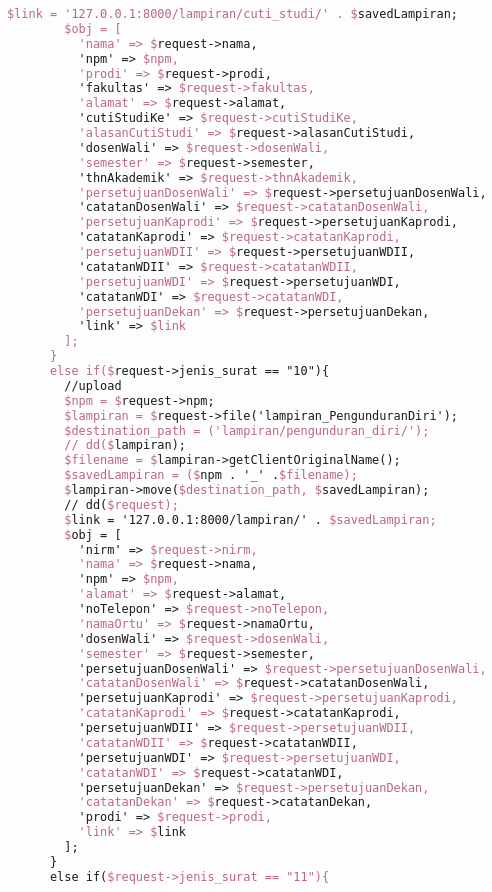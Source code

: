 \begin{lstlisting}[language=tex,basicstyle=\tiny,caption=PesanansuratController.php]
        $link = '127.0.0.1:8000/lampiran/cuti_studi/' . $savedLampiran;
        $obj = [
          'nama' => $request->nama,
          'npm' => $npm,
          'prodi' => $request->prodi,
          'fakultas' => $request->fakultas,
          'alamat' => $request->alamat,
          'cutiStudiKe' => $request->cutiStudiKe,
          'alasanCutiStudi' => $request->alasanCutiStudi,
          'dosenWali' => $request->dosenWali,
          'semester' => $request->semester,
          'thnAkademik' => $request->thnAkademik,
          'persetujuanDosenWali' => $request->persetujuanDosenWali,
          'catatanDosenWali' => $request->catatanDosenWali,
          'persetujuanKaprodi' => $request->persetujuanKaprodi,
          'catatanKaprodi' => $request->catatanKaprodi,
          'persetujuanWDII' => $request->persetujuanWDII,
          'catatanWDII' => $request->catatanWDII,
          'persetujuanWDI' => $request->persetujuanWDI,
          'catatanWDI' => $request->catatanWDI,
          'persetujuanDekan' => $request->persetujuanDekan,
          'link' => $link
        ];
      }
      else if($request->jenis_surat == "10"){
        //upload
        $npm = $request->npm;
        $lampiran = $request->file('lampiran_PengunduranDiri');
        $destination_path = ('lampiran/pengunduran_diri/');
        // dd($lampiran);
        $filename = $lampiran->getClientOriginalName();
        $savedLampiran = ($npm . '_' .$filename);
        $lampiran->move($destination_path, $savedLampiran);
        // dd($request);
        $link = '127.0.0.1:8000/lampiran/' . $savedLampiran;
        $obj = [
          'nirm' => $request->nirm,
          'nama' => $request->nama,
          'npm' => $npm,
          'alamat' => $request->alamat,
          'noTelepon' => $request->noTelepon,
          'namaOrtu' => $request->namaOrtu,
          'dosenWali' => $request->dosenWali,
          'semester' => $request->semester,
          'persetujuanDosenWali' => $request->persetujuanDosenWali,
          'catatanDosenWali' => $request->catatanDosenWali,
          'persetujuanKaprodi' => $request->persetujuanKaprodi,
          'catatanKaprodi' => $request->catatanKaprodi,
          'persetujuanWDII' => $request->persetujuanWDII,
          'catatanWDII' => $request->catatanWDII,
          'persetujuanWDI' => $request->persetujuanWDI,
          'catatanWDI' => $request->catatanWDI,
          'persetujuanDekan' => $request->persetujuanDekan,
          'catatanDekan' => $request->catatanDekan,
          'prodi' => $request->prodi,
          'link' => $link
        ];
      }
      else if($request->jenis_surat == "11"){

\end{lstlisting}
